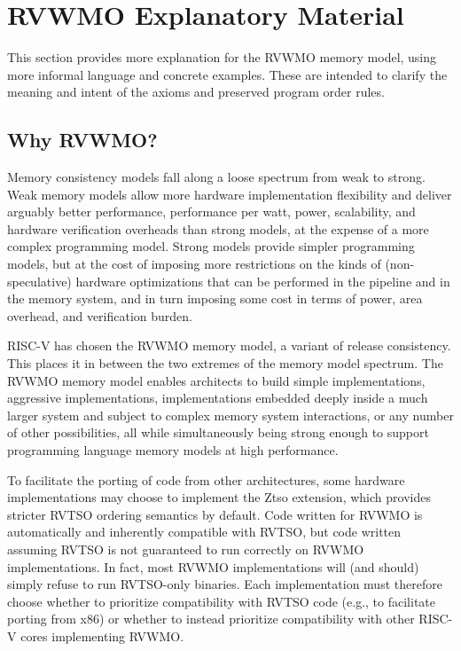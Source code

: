 \newcommand{\diagram}{\textcolor{red}{(picture coming soon)}}
\makeatletter
\gdef\SetFigFont#1#2#3#4#5{%
  \reset@font\fontsize{12}{#2pt}%
  \fontfamily{\sfdefault}\fontseries{#4}\fontshape{#5}%
  \selectfont}
\makeatother

\chapter{RVWMO Explanatory Material}
\label{sec:explanation}
This section provides more explanation for the RVWMO memory model, using more informal language and concrete examples.
These are intended to clarify the meaning and intent of the axioms and preserved program order rules.

\section{Why RVWMO?}
\label{sec:whynottso}

Memory consistency models fall along a loose spectrum from weak to strong.
Weak memory models allow more hardware implementation flexibility and deliver arguably better performance, performance per watt, power, scalability, and hardware verification overheads than strong models, at the expense of a more complex programming model.
Strong models provide simpler programming models, but at the cost of imposing more restrictions on the kinds of (non-speculative) hardware optimizations that can be performed in the pipeline and in the memory system, and in turn imposing some cost in terms of power, area overhead, and verification burden.

RISC-V has chosen the RVWMO memory model, a variant of release consistency.
This places it in between the two extremes of the memory model spectrum.
The RVWMO memory model enables architects to build simple implementations, aggressive implementations, implementations embedded deeply inside a much larger system and subject to complex memory system interactions, or any number of other possibilities, all while simultaneously being strong enough to support programming language memory models at high performance.

To facilitate the porting of code from other architectures, some hardware implementations may choose to implement the Ztso extension, which provides stricter RVTSO ordering semantics by default.
Code written for RVWMO is automatically and inherently compatible with RVTSO, but code written assuming RVTSO is not guaranteed to run correctly on RVWMO implementations.
In fact, most RVWMO implementations will (and should) simply refuse to run RVTSO-only binaries.
Each implementation must therefore choose whether to prioritize compatibility with RVTSO code (e.g., to facilitate porting from x86) or whether to instead prioritize compatibility with other RISC-V cores implementing RVWMO.

